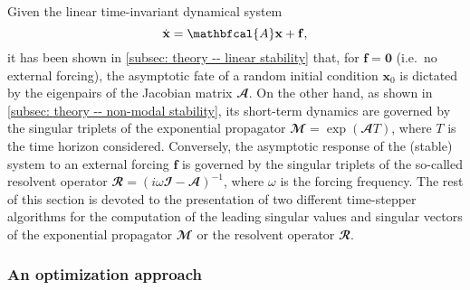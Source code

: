   Given the linear time-invariant dynamical system
  \begin{equation}
    \dot{\mathbf{x}} = \mathbfcal{A} \mathbf{x} + \mathbf{f},
    \notag
  \end{equation}
  it has been shown in \textsection \ref{subsec: theory -- linear stability} that, for $\mathbf{f} = \mathbf{0}$ (i.e.\ no external forcing), the asymptotic fate of a random initial condition $\mathbf{x}_0$ is dictated by the eigenpairs of the Jacobian matrix $\mathbfcal{A}$. On the other hand, as shown in \textsection \ref{subsec: theory -- non-modal stability}, its short-term dynamics are governed by the singular triplets of the exponential propagator $\mathbfcal{M} = \exp \left( \mathbfcal{A} T \right)$, where $T$ is the time horizon considered. Conversely, the asymptotic response of the (stable) system to an external forcing $\mathbf{f}$ is governed by the singular triplets of the so-called resolvent operator $\mathbfcal{R} = \left( i\omega \mathbfcal{I} - \mathbfcal{A} \right)^{-1}$, where $\omega$ is the forcing frequency. The rest of this section is devoted to the presentation of two different time-stepper algorithms for the computation of the leading singular values and singular vectors of the exponential propagator $\mathbfcal{M}$ or the resolvent operator $\mathbfcal{R}$.

  \subsubsection{An optimization approach}


